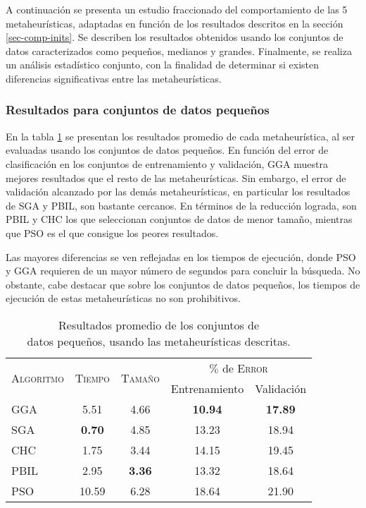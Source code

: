 A continuación se presenta un estudio fraccionado del comportamiento de las 5 metaheurísticas, adaptadas en función de los resultados descritos en la sección \ref{sec-comp-inits}. Se describen los resultados obtenidos usando los conjuntos de datos caracterizados como pequeños, medianos y grandes. Finalmente, se realiza un análisis estadístico conjunto, con la finalidad de determinar si existen diferencias significativas entre las metaheurísticas.

\subsubsection{Resultados para conjuntos de datos pequeños}

En la tabla \ref{res-small} se presentan los resultados promedio de cada metaheurística, al ser evaluadas usando los conjuntos de datos pequeños. En función del error de clasificación en los conjuntos de entrenamiento y validación, GGA muestra mejores resultados que el resto de las metaheurísticas. Sin embargo, el error de validación alcanzado por las demás metaheurísticas, en particular los resultados de SGA y PBIL, son bastante cercanos. En términos de la reducción lograda, son PBIL y CHC los que seleccionan conjuntos de datos de menor tamaño, mientras que PSO es el que consigue los peores resultados.

Las mayores diferencias se ven reflejadas en los tiempos de ejecución, donde PSO y GGA requieren de un mayor número de segundos para concluir la búsqueda. No obstante, cabe destacar que sobre los conjuntos de datos pequeños, los tiempos de ejecución de estas metaheurísticas no son prohibitivos.

\begin{table}[h!]
\centering
\begin{tabular}{l c c c c}
\hline
\multirow{2}{*}{\textsc{Algoritmo}}
	& \multirow{2}{*}{\textsc{Tiempo}}
	& \multirow{2}{*}{\textsc{Tamaño}}
	& \multicolumn{2}{c}{$\%$ de \textsc{Error}} \\\cline{4-5}
 & & & \scriptsize{Entrenamiento} & \scriptsize{Validación} \\
\hline
\hline
GGA  &  5.51 & 4.66 & \textbf{10.94} & \textbf{17.89} \\
SGA  & \textbf{0.70} & 4.85 & 13.23 & 18.94 \\
CHC  &  1.75 & 3.44 & 14.15 & 19.45 \\
PBIL &  2.95 & \textbf{3.36} & 13.32 & 18.64 \\
PSO  & 10.59 & 6.28 & 18.64 & 21.90 \\
\hline
\end{tabular}
\caption[Resultados de metaheurísticas usando conjuntos de datos pequeños]{Resultados promedio de los conjuntos de\\datos pequeños, usando las metaheurísticas descritas.}
\label{res-small}
\end{table}

